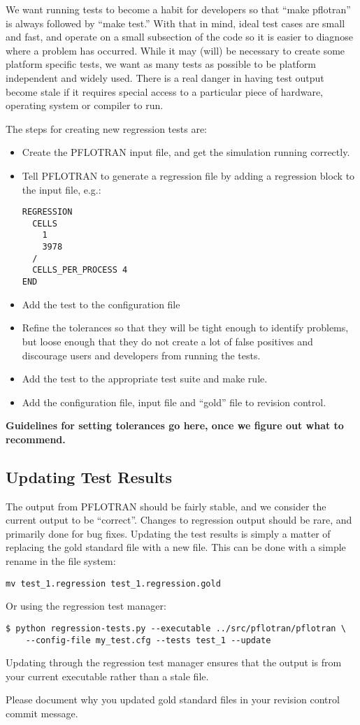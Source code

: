 We want running tests to become a habit for developers so that ``make
pflotran'' is always followed by ``make test.'' With that in mind, ideal
test cases are small and fast, and operate on a small subsection of
the code so it is easier to diagnose where a problem has
occurred. While it may (will) be necessary to create some platform
specific tests, we want as many tests as possible to be platform
independent and widely used. There is a real danger in having test
output become stale if it requires special access to a particular
piece of hardware, operating system or compiler to run.

The steps for creating new regression tests are:
\begin{itemize}
\item Create the PFLOTRAN input file, and get the simulation running
  correctly.

\item Tell PFLOTRAN to generate a regression file by adding a
  regression block to the input file, e.g.:
\begin{verbatim}
REGRESSION
  CELLS 
    1
    3978
  /
  CELLS_PER_PROCESS 4
END
\end{verbatim}

\item Add the test to the configuration file

\item Refine the tolerances so that they will be tight enough to
  identify problems, but loose enough that they do not create a lot of
  false positives and discourage users and developers from running the
  tests.

\item Add the test to the appropriate test suite and make rule.

\item Add the configuration file, input file and ``gold'' file to revision control.

\end{itemize}

\textbf{Guidelines for setting tolerances go here, once we figure out what to recommend.}

\subsection{Updating Test Results}

The output from PFLOTRAN should be fairly stable, and we consider the
current output to be ``correct''. Changes to regression output should
be rare, and primarily done for bug fixes. Updating the test results
is simply a matter of replacing the gold standard file with a new
file. This can be done with a simple rename in the file system:
\begin{verbatim}
mv test_1.regression test_1.regression.gold
\end{verbatim}
Or using the regression test manager:
\begin{verbatim}
$ python regression-tests.py --executable ../src/pflotran/pflotran \
    --config-file my_test.cfg --tests test_1 --update
\end{verbatim}
Updating through the regression test manager ensures that the output
is from your current executable rather than a stale file.

Please document why you updated gold standard files in
your revision control commit message.
